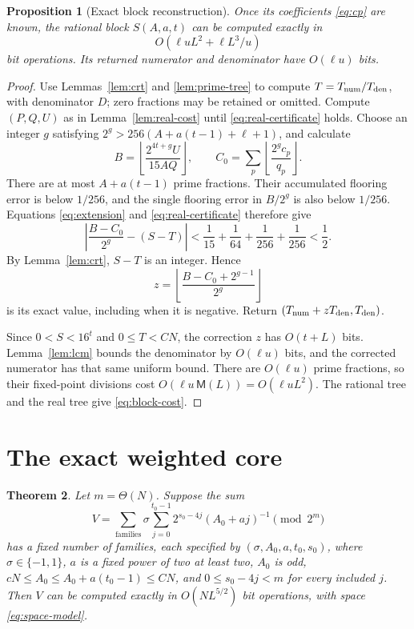 \documentclass[11pt]{article}
\numberwithin{equation}{section}
\newtheorem{theorem}{Theorem}[section]
\newtheorem{proposition}[theorem]{Proposition}
\theoremstyle{definition}
\newcommand{\M}{\mathsf M}
\begin{document}
\begin{proposition}[Exact block reconstruction]\label{prop:block}
Once its coefficients \eqref{eq:cp} are known, the rational
block $S(A,a,t)$ can be computed exactly in
\begin{equation}\label{eq:block-cost}
 O(\ell uL^2+\ell L^3/u)
\end{equation}
bit operations. Its returned numerator and denominator have
$O(\ell u)$ bits.
\end{proposition}

\begin{proof}
Use Lemmas~\ref{lem:crt} and \ref{lem:prime-tree} to compute
$T=T_{\rm num}/T_{\rm den}$, with denominator $D$; zero
fractions may be retained or omitted. Compute $(P,Q,U)$ as in
Lemma~\ref{lem:real-cost} until \eqref{eq:real-certificate} holds.
Choose an integer $g$ satisfying
$2^g>256(A+a(t-1)+\ell+1)$, and calculate
\begin{equation}\label{eq:round-input}
 B=\left\lfloor\frac{2^{4t+g}U}{15AQ}\right\rfloor,\qquad
 C_0=\sum_p\left\lfloor\frac{2^g c_p}{q_p}\right\rfloor.
\end{equation}
There are at most $A+a(t-1)$ prime fractions. Their accumulated
flooring error is below $1/256$, and the single flooring error
in $B/2^g$ is also below $1/256$. Equations
\eqref{eq:extension} and \eqref{eq:real-certificate} therefore give
\[
 \left|\frac{B-C_0}{2^g}-(S-T)\right|
 <\frac1{15}+\frac1{64}+\frac1{256}+\frac1{256}<\frac12.
\]
By Lemma~\ref{lem:crt}, $S-T$ is an integer. Hence
\begin{equation}\label{eq:z}
 z=\left\lfloor\frac{B-C_0+2^{g-1}}{2^g}\right\rfloor
\end{equation}
is its exact value, including when it is negative.
Return $(T_{\rm num}+zT_{\rm den},T_{\rm den})$.

Since $0<S<16^t$ and $0\le T<CN$, the correction $z$ has
$O(t+L)$ bits. Lemma~\ref{lem:lcm} bounds the denominator
by $O(\ell u)$ bits, and the corrected numerator has that same
uniform bound. There are $O(\ell u)$ prime fractions, so
their fixed-point divisions cost
$O(\ell u\,\M(L))=O(\ell uL^2)$.
The rational tree and the real tree give \eqref{eq:block-cost}.
\end{proof}

\section{The exact weighted core}\label{sec:core}

\begin{theorem}\label{thm:core}
Let $m=\Theta(N)$. Suppose the sum
\[
 V=\sum_{\text{families}}\sigma
       \sum_{j=0}^{t_0-1}2^{s_0-4j}(A_0+aj)^{-1}
       \pmod{2^m}
\]
has a fixed number of families, each specified by
$(\sigma,A_0,a,t_0,s_0)$, where $\sigma\in\{-1,1\}$,
$a$ is a fixed power of two at least two, $A_0$ is odd,
$cN\le A_0\le A_0+a(t_0-1)\le CN$, and
$0\le s_0-4j<m$ for every included $j$.
Then $V$ can be computed exactly in $O(NL^{5/2})$ bit
operations, with space \eqref{eq:space-model}.
\end{theorem}
\end{document}
